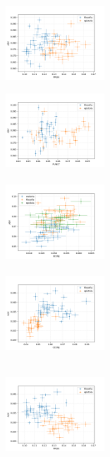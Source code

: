 \documentclass[10pt,a4paper,onecolumn]{article}
\theoremstyle{definition}
\theoremstyle{remark}
\begin{document}
\begin{figure}[htpb!]
\begin{multicols}{3}
		\includegraphics[width=0.33\textwidth]{graficos/ADV_x_PRON.png}  \\
	\end{multicols}\vspace{-0.8cm}
	\begin{multicols}{3}
		\includegraphics[width=0.33\textwidth]{graficos/ADV_x_PUNCT.png} \\  \\
		\includegraphics[width=0.33\textwidth]{graficos/ADV_x_SCONJ.png} \\  \\
		\includegraphics[width=0.33\textwidth]{graficos/AUX_x_CCONJ.png} \\  \\
	\end{multicols}\vspace{-0.8cm}
	\begin{multicols}{3}
		\includegraphics[width=0.33\textwidth]{graficos/AUX_x_PRON.png} \\  \\

\end{multicols}
\end{figure}
\end{document}

